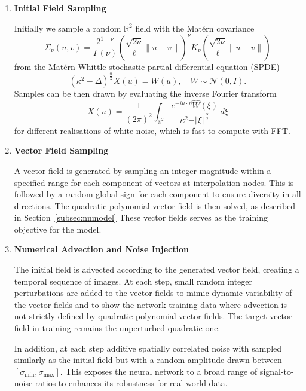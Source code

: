 \documentclass[a4paper,12pt]{article}
\begin{document}
\begin{enumerate}
    \item
        \textbf{Initial Field Sampling}

        Initially we sample a random $\mathbb{R}^2$ field with the Matérn covariance
        \begin{equation}
            \Sigma_{\nu}(u,v) = \frac{2^{1-\nu}}{\Gamma(\nu)} \left(\frac{\sqrt{2\nu}}{\ell} \lVert u - v \rVert\right)^{\nu} K_{\nu}\left(\frac{\sqrt{2\nu}}{\ell} \lVert u - v \rVert \right)
        \end{equation}
        from the Matérn-Whittle stochastic partial differential equation (SPDE)~\cite{whittle63, lindgren}
        \begin{equation}\label{eq:maternspde}
            (\kappa^2 - \Delta)^{\frac{\alpha}{2}} X(u) = W(u), \quad W \sim \mathcal{N}(0, I).
        \end{equation}
        Samples can be then drawn by evaluating the inverse Fourier transform
        \begin{equation}
            X(u) = \frac{1}{(2 \pi)^2} \int_{\mathbb{R}^2} \frac{e^{-i u \cdot \eta} \hat{W}(\xi)}{\kappa^2 - \Vert \xi \Vert ^{\frac{\alpha}{2}}} \, d \xi
        \end{equation}
        for different realisations of white noise, which is fast to compute with FFT.

    \item
        \textbf{Vector Field Sampling}

        A vector field is generated by sampling an integer magnitude within a specified range for each component of vectors at interpolation nodes.
        This is followed by a random global sign for each component to ensure diversity in all directions.
        The quadratic polynomial vector field is then solved, as described in Section~\ref{subsec:nnmodel}
        These vector fields serves as the training objective for the model.

    \item
        \textbf{Numerical Advection and Noise Injection}

        The initial field is advected according to the generated vector field, creating a temporal sequence of images.
        At each step, small random integer perturbations are added to the vector fields to mimic dynamic variability of the vector fields and to show the network training data where advection is not strictly defined by quadratic polynomial vector fields.
        The target vector field in training remains the unperturbed quadratic one.

        In addition, at each step additive spatially correlated noise with sampled similarly as the initial field but with a random amplitude drawn between $[\sigma_{\text{min}}, \sigma_{\text{max}}]$.
        This exposes the neural network to a broad range of signal-to-noise ratios to enhances its robustness for real-world data.
\end{enumerate}
\end{document}
